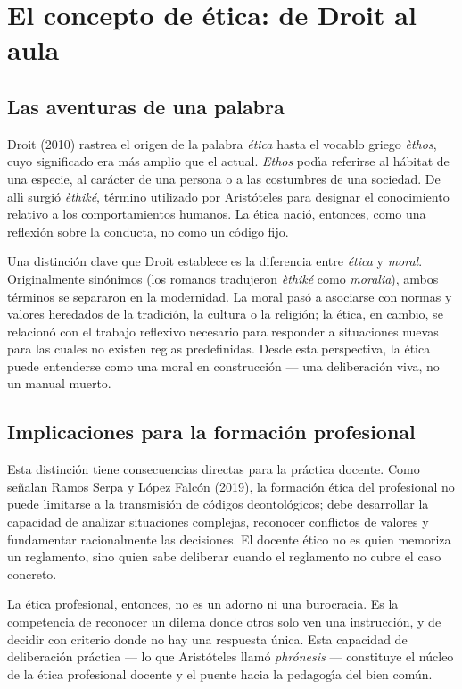\documentclass[12pt,letterpaper]{article}
\begin{document}
\section{El concepto de \'etica: de Droit al aula}

\subsection{Las aventuras de una palabra}

Droit (2010) rastrea el origen de la palabra \textit{\'etica} hasta el vocablo griego \textit{\`ethos}, cuyo significado era m\'as amplio que el actual. \textit{Ethos} pod\'{\i}a referirse al h\'abitat de una especie, al car\'acter de una persona o a las costumbres de una sociedad. De all\'{\i} surgi\'o \textit{\`ethik\'e}, t\'ermino utilizado por Arist\'oteles para designar el conocimiento relativo a los comportamientos humanos. La \'etica naci\'o, entonces, como una reflexi\'on sobre la conducta, no como un c\'odigo fijo.

Una distinci\'on clave que Droit establece es la diferencia entre \textit{\'etica} y \textit{moral}. Originalmente sin\'onimos (los romanos tradujeron \textit{\`ethik\'e} como \textit{moralia}), ambos t\'erminos se separaron en la modernidad. La moral pas\'o a asociarse con normas y valores heredados de la tradici\'on, la cultura o la religi\'on; la \'etica, en cambio, se relacion\'o con el trabajo reflexivo necesario para responder a situaciones nuevas para las cuales no existen reglas predefinidas. Desde esta perspectiva, la \'etica puede entenderse como una moral en construcci\'on --- una deliberaci\'on viva, no un manual muerto.

\subsection{Implicaciones para la formaci\'on profesional}

Esta distinci\'on tiene consecuencias directas para la pr\'actica docente. Como se\~nalan Ramos Serpa y L\'opez Falc\'on (2019), la formaci\'on \'etica del profesional no puede limitarse a la transmisi\'on de c\'odigos deontol\'ogicos; debe desarrollar la capacidad de analizar situaciones complejas, reconocer conflictos de valores y fundamentar racionalmente las decisiones. El docente \'etico no es quien memoriza un reglamento, sino quien sabe deliberar cuando el reglamento no cubre el caso concreto.

La \'etica profesional, entonces, no es un adorno ni una burocracia. Es la competencia de reconocer un dilema donde otros solo ven una instrucci\'on, y de decidir con criterio donde no hay una respuesta \'unica. Esta capacidad de deliberaci\'on pr\'actica --- lo que Arist\'oteles llam\'o \textit{phr\'onesis} --- constituye el n\'ucleo de la \'etica profesional docente y el puente hacia la pedagog\'{\i}a del bien com\'un.
\end{document}
